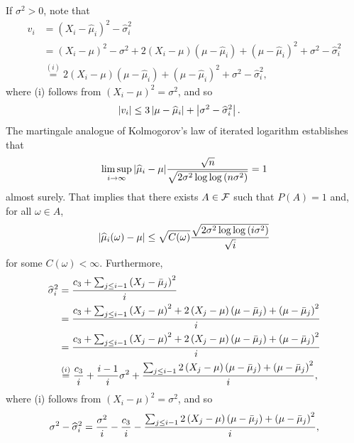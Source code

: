    If $\sigma^2 >  0$, note that
    \begin{align*}
        v_i &=  (X_i - \widehat\mu_i)^2 - \widehat\sigma_i^2
        \\&=  (X_i - \mu)^2 - \sigma^2 + 2(X_i - \mu)(\mu-\widehat\mu_i) + (\mu-\widehat\mu_i)^2 + \sigma^2 - \widehat\sigma_i^2
        \\&\stackrel{(i)}{=} 2(X_i - \mu)(\mu-\widehat\mu_i) + (\mu-\widehat\mu_i)^2 + \sigma^2 - \widehat\sigma_i^2,
    \end{align*}
    where (i) follows from $(X_i - \mu)^2 = \sigma^2$, and so
    \begin{align*}
        \left| v_i \right|  &\leq  3\left| \mu-\widehat\mu_i \right| + \left| \sigma^2 - \widehat\sigma_i^2 \right|.
    \end{align*}
     The martingale analogue of Kolmogorov's law of iterated logarithm \citep{stout1970martingale} establishes that 
    \begin{align*}
        \limsup_{i \to \infty} |\widehat\mu_i - \mu|\frac{\sqrt n}{\sqrt{2 \sigma^2 \log \log \left( n \sigma^2 \right) }} = 1
    \end{align*}
    almost surely. That implies that there exists $A \in \mathcal{F}$ such that $P(A) = 1$ and, for all $\omega \in A$, 
    \begin{align*}
        |\widehat\mu_i(\omega) - \mu| \leq \sqrt {C(\omega) }\frac{\sqrt{2 \sigma^2 \log \log \left( i \sigma^2 \right) }}{\sqrt i}
    \end{align*}
    for some $C(\omega) < \infty$.
    Furthermore, 
    \begin{align*}
        \widehat\sigma_i^2 &= \frac{c_3 + \sum_{j \leq i -1} \left( X_j - \bar\mu_j \right)^2}{i}
        \\&= \frac{c_3 + \sum_{j \leq i -1} \left( X_j - \mu \right)^2 + 2\left( X_j - \mu \right)\left( \mu - \bar\mu_j \right) + \left( \mu - \bar\mu_j \right)^2}{i}
        \\&= \frac{c_3 + \sum_{j \leq i -1} \left( X_j - \mu \right)^2 + 2\left( X_j - \mu \right)\left( \mu - \bar\mu_j \right) + \left( \mu - \bar\mu_j \right)^2}{i}
        \\&\stackrel{(i)}{=} \frac{c_3}{i} + \frac{i-1}{i} \sigma^2 +  \frac{ \sum_{j \leq i -1} 2\left( X_j - \mu \right)\left( \mu - \bar\mu_j \right) + \left( \mu - \bar\mu_j \right)^2}{i},
    \end{align*}
    where (i) follows from $(X_i - \mu)^2 = \sigma^2$, and so 
    \begin{align*}
        \sigma^2 - \widehat\sigma_i^2 = \frac{\sigma^2}{i} -\frac{c_3}{i}   -  \frac{ \sum_{j \leq i -1} 2\left( X_j - \mu \right)\left( \mu - \bar\mu_j \right) + \left( \mu - \bar\mu_j \right)^2}{i},
    \end{align*}
